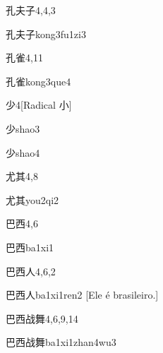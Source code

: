 \begin{entry}{孔夫子}{4,4,3}
  \begin{phonetics}{孔夫子}{kong3fu1zi3}
  \end{phonetics}
\end{entry}

\begin{entry}{孔雀}{4,11}
  \begin{phonetics}{孔雀}{kong3que4}
  \end{phonetics}
\end{entry}

\begin{entry}{少}{4}[Radical 小]
  \begin{phonetics}{少}{shao3}
  \end{phonetics}
  \begin{phonetics}{少}{shao4}
  \end{phonetics}
\end{entry}

\begin{entry}{尤其}{4,8}
  \begin{phonetics}{尤其}{you2qi2}
  \end{phonetics}
\end{entry}

\begin{entry}{巴西}{4,6}
  \begin{phonetics}{巴西}{ba1xi1}
  \end{phonetics}
\end{entry}

\begin{entry}{巴西人}{4,6,2}
  \begin{phonetics}{巴西人}{ba1xi1ren2}
    [Ele é brasileiro.]
  \end{phonetics}
\end{entry}

\begin{entry}{巴西战舞}{4,6,9,14}
  \begin{phonetics}{巴西战舞}{ba1xi1zhan4wu3}
  \end{phonetics}
\end{entry}

